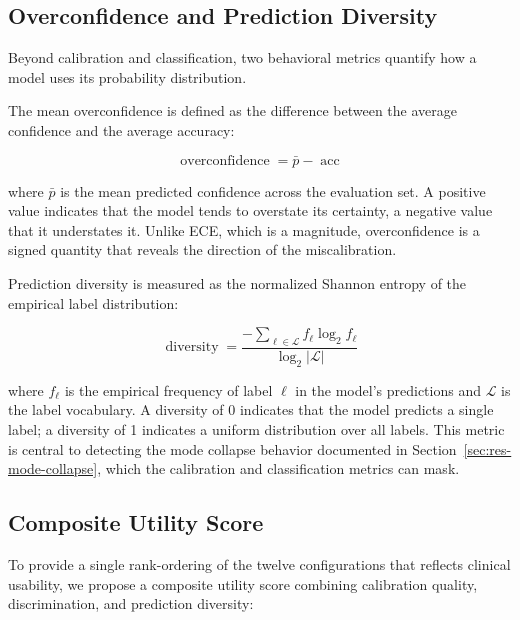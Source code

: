 \subsection{Overconfidence and Prediction Diversity}
\label{subsec:met-behavioral}

Beyond calibration and classification, two behavioral metrics quantify 
how a model uses its probability distribution.

The mean overconfidence is defined as the difference between the average 
confidence and the average accuracy:

\begin{equation}
    \operatorname{overconfidence} = \bar{p} - \operatorname{acc}
    \label{eq:overconf}
\end{equation}

where $\bar{p}$ is the mean predicted confidence across the evaluation 
set. A positive value indicates that the model tends to overstate its 
certainty, a negative value that it understates it. Unlike ECE, which is 
a magnitude, overconfidence is a signed quantity that reveals the 
direction of the miscalibration.

Prediction diversity is measured as the normalized Shannon entropy of 
the empirical label distribution:

\begin{equation}
    \operatorname{diversity} = 
    \frac{
        -\sum_{\ell \in \mathcal{L}} f_\ell \log_2 f_\ell
    }{
        \log_2 |\mathcal{L}|
    }
    \label{eq:diversity}
\end{equation}

where $f_\ell$ is the empirical frequency of label $\ell$ in the model's 
predictions and $\mathcal{L}$ is the label vocabulary. A diversity of 0 
indicates that the model predicts a single label; a diversity of 1 
indicates a uniform distribution over all labels. This metric is central 
to detecting the mode collapse behavior documented in 
Section~\ref{sec:res-mode-collapse}, which the calibration and 
classification metrics can mask.

\subsection{Composite Utility Score}
\label{subsec:met-composite}

To provide a single rank-ordering of the twelve configurations that 
reflects clinical usability, we propose a composite utility score 
combining calibration quality, discrimination, and prediction diversity:


